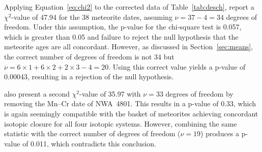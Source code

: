 \documentclass{article}
\begin{document}
Applying Equation~\ref{eq:chi2} to the corrected data of
Table~\ref{tab:desch}, \citet{desch2023b} report a $\chi^2$-value of
47.94 for the 38 meteorite dates, assuming $\nu=37-4=34$ degrees of
freedom. Under this assumption, the p-value for the chi-square test is
0.057, which is greater than 0.05 and failure to reject the null
hypothesis that the meteorite ages are all concordant. However, as
discussed in Section~\ref{sec:means}, the correct number of degrees of
freedom is not $34$ but
$\nu={6}\times{1}+{6}\times{2}+{2}\times{3}-4=20$. Using this correct
value yields a p-value of 0.00043, resulting in a rejection of the
null hypothesis.\medskip

\citet{desch2023b} also present a second $\chi^2$-value of 35.97 with
$\nu=33$ degrees of freedom by removing the Mn--Cr date of NWA~4801.
This results in a p-value of 0.33, which is again seemingly compatible
with the basket of meteorites achieving concordant isotopic closure
for all four isotopic systems. However, combining the same statistic
with the correct number of degrees of freedom ($\nu=19$) produces a
p-value of 0.011, which contradicts this conclusion.
\end{document}
